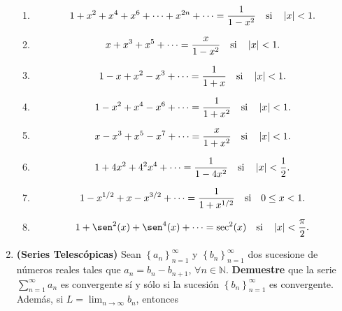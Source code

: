 \documentclass[12pt]{article}
\begin{document}
\begin{enumerate}
    \begin{enumerate}
        \item \begin{equation*}
            1+x^2+x^4+x^6+\cdots+x^{2n}+\cdots=\frac{1}{1-x^2}\quad\textup{si}\quad\left| x \right|<1.
        \end{equation*}
        \item \begin{equation*}
            x+x^3+x^5+\cdots=\frac{x}{1-x^2}\quad\textup{si}\quad\left| x \right|<1.
        \end{equation*}
        \item \begin{equation*}
            1-x+x^2-x^3+\cdots=\frac{1}{1+x}\quad\textup{si}\quad\left| x \right|<1.
        \end{equation*}
        \item \begin{equation*}
            1-x^2+x^4-x^6+\cdots=\frac{1}{1+x^2}\quad\textup{si}\quad\left| x \right|<1.
        \end{equation*}
        \item \begin{equation*}
            x-x^3+x^5-x^7+\cdots=\frac{x}{1+x^2}\quad\textup{si}\quad\left| x \right|<1.
        \end{equation*}
        \item \begin{equation*}
            1+4x^2+4^2x^4+\cdots=\frac{1}{1-4x^2}\quad\textup{si}\quad\left| x \right|<\frac{1}{2}.
        \end{equation*}
        \item \begin{equation*}
            1-x^{1/2}+x-x^{3/2}+\cdots=\frac{1}{1+x^{1/2}}\quad\textup{si}\quad0\leq x<1.
        \end{equation*}
        \item \begin{equation*}
            1+\sen^2(x)+\sen^4(x)+\cdots=\sec^2(x)\quad\textup{si}\quad\abs{x}<\frac{\pi}{2}.
        \end{equation*}
    \end{enumerate}
    \item \textbf{(Series Telescópicas)} Sean $\left\{a_n\right\}_{n=1}^{\infty}$ y $\left\{b_n\right\}_{n=1}^{\infty}$ dos sucesione de números reales tales que $a_n=b_n-b_{n+1}$, $\forall n\in\mathbb{N}$. \textbf{Demuestre} que la serie $\sum_{n=1}^{\infty}a_n$ es convergente sí y sólo si la sucesión $\left\{b_n\right\}_{n=1}^{\infty}$ es convergente. Además, si $L=\lim_{n\rightarrow\infty}b_n$, entonces

\end{enumerate}
\end{document}
